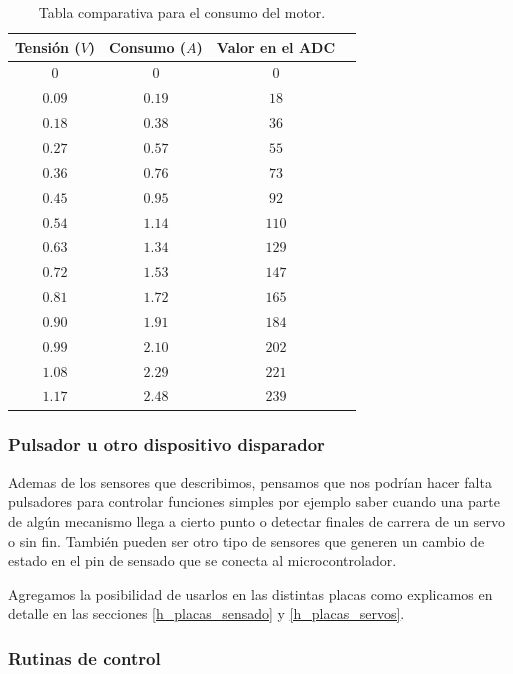 \begin{table}[ht]
	\begin{center}
		\begin{tabular}{|c|c|c|c|}
			\hline
			Tensi\'on ($V$) & Consumo ($A$) & Valor en el ADC \\
			\hline
			$0$ & $0$ & $0$ \\
			$0.09$ & $0.19$ & $18$ \\
			$0.18$ & $0.38$ & $36$ \\
			$0.27$ & $0.57$ & $55$ \\
			$0.36$ & $0.76$ & $73$ \\
			$0.45$ & $0.95$ & $92$ \\
			$0.54$ & $1.14$ & $110$ \\
			$0.63$ & $1.34$ & $129$ \\
			$0.72$ & $1.53$ & $147$ \\
			$0.81$ & $1.72$ & $165$ \\
			$0.90$ & $1.91$ & $184$ \\
			$0.99$ & $2.10$ & $202$ \\
			$1.08$ & $2.29$ & $221$ \\
			$1.17$ & $2.48$ & $239$ \\
			\hline
		\end{tabular}
	\end{center}
	\caption{Tabla comparativa para el consumo del motor.}
	\label{hT_consumo}
\end{table}

\subsubsection{Pulsador u otro dispositivo disparador}
\label{h_sensado_pulsador}

Ademas de los sensores que describimos, pensamos que nos podr\'ian hacer falta pulsadores para controlar funciones
simples por ejemplo saber cuando una parte de alg\'un mecanismo llega a cierto punto o detectar finales de carrera
de un servo o sin fin.
Tambi\'en pueden ser otro tipo de sensores que generen un cambio de estado en el pin de sensado que se conecta al
microcontrolador.

Agregamos la posibilidad de usarlos en las distintas placas como explicamos en detalle en las secciones
\ref{h_placas_sensado} y \ref{h_placas_servos}.

\subsubsection{Rutinas de control}
\label{h_sensado_pulsador_rutinas}

